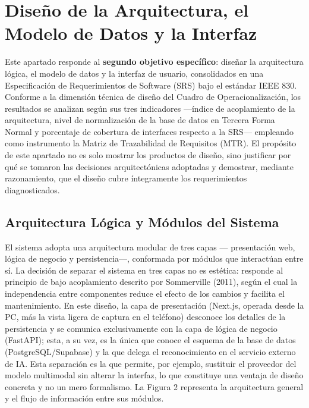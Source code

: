 \documentclass[12pt, letterpaper]{report}
\begin{document}
\section{Diseño de la Arquitectura, el Modelo de Datos y la Interfaz}

Este apartado responde al \textbf{segundo objetivo específico}: diseñar
la arquitectura lógica, el modelo de datos y la interfaz de usuario,
consolidados en una Especificación de Requerimientos de Software (SRS)
bajo el estándar IEEE 830. Conforme a la dimensión técnica de diseño
del Cuadro de Operacionalización, los resultados se analizan según sus
tres indicadores ---índice de acoplamiento de la arquitectura, nivel de
normalización de la base de datos en Tercera Forma Normal y porcentaje
de cobertura de interfaces respecto a la SRS--- empleando como
instrumento la Matriz de Trazabilidad de Requisitos (MTR). El propósito
de este apartado no es solo mostrar los productos de diseño, sino
justificar por qué se tomaron las decisiones arquitectónicas adoptadas
y demostrar, mediante razonamiento, que el diseño cubre íntegramente
los requerimientos diagnosticados.

\subsection{Arquitectura Lógica y Módulos del Sistema}

El sistema adopta una arquitectura modular de tres capas ---
presentación web, lógica de negocio y persistencia---, conformada por
módulos que interactúan entre sí. La decisión de separar el sistema en
tres capas no es estética: responde al principio de bajo acoplamiento
descrito por Sommerville (2011), según el cual la independencia entre
componentes reduce el efecto de los cambios y facilita el
mantenimiento. En este diseño, la capa de presentación (Next.js,
operada desde la PC, más la vista ligera de captura en el teléfono)
desconoce los detalles de la persistencia y se comunica exclusivamente
con la capa de lógica de negocio (FastAPI); esta, a su vez, es la única
que conoce el esquema de la base de datos (PostgreSQL/Supabase) y la
que delega el reconocimiento en el servicio externo de IA. Esta
separación es la que permite, por ejemplo, sustituir el proveedor del
modelo multimodal sin alterar la interfaz, lo que constituye una
ventaja de diseño concreta y no un mero formalismo. La Figura 2
representa la arquitectura general y el flujo de información entre sus
módulos.
\end{document}
